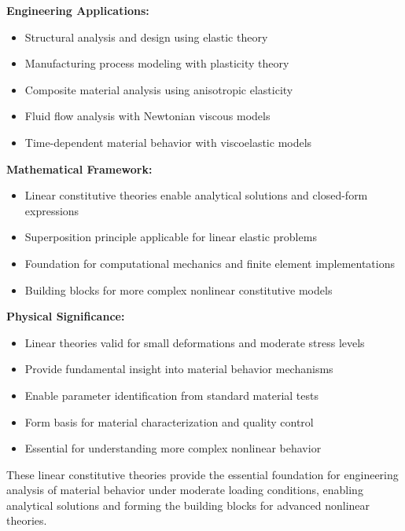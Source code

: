 \begin{subox}[Summary]
\textbf{Engineering Applications:}
\begin{itemize}
\item Structural analysis and design using elastic theory
\item Manufacturing process modeling with plasticity theory
\item Composite material analysis using anisotropic elasticity
\item Fluid flow analysis with Newtonian viscous models
\item Time-dependent material behavior with viscoelastic models
\end{itemize}

\textbf{Mathematical Framework:}
\begin{itemize}
\item Linear constitutive theories enable analytical solutions and closed-form expressions
\item Superposition principle applicable for linear elastic problems
\item Foundation for computational mechanics and finite element implementations
\item Building blocks for more complex nonlinear constitutive models
\end{itemize}

\textbf{Physical Significance:}
\begin{itemize}
\item Linear theories valid for small deformations and moderate stress levels
\item Provide fundamental insight into material behavior mechanisms
\item Enable parameter identification from standard material tests
\item Form basis for material characterization and quality control
\item Essential for understanding more complex nonlinear behavior
\end{itemize}

These linear constitutive theories provide the essential foundation for engineering analysis of material behavior under moderate loading conditions, enabling analytical solutions and forming the building blocks for advanced nonlinear theories.
\end{subox}
